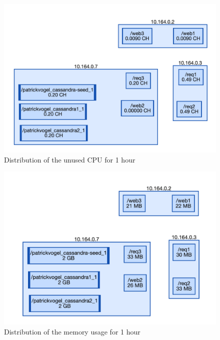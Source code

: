 \begin{figure}
    \centering
    \includegraphics[width=\textwidth]{gfx/demo_cpu_waste}
    \caption{Distribution of the unused CPU for 1 hour}
    \label{fig:demo_cpu_waste}
\end{figure}

\begin{figure}
    \centering
    \includegraphics[width=\textwidth]{gfx/demo_mem_cost}
    \caption{Distribution of the memory usage for 1 hour}
    \label{fig:demo_mem_cost}
\end{figure}


